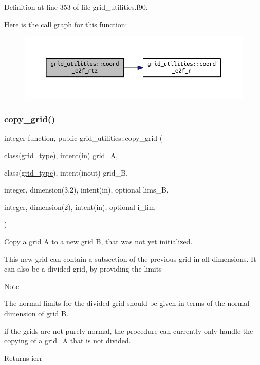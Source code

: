 Definition at line 353 of file grid\+\_\+utilities.\+f90.

Here is the call graph for this function\+:
\nopagebreak
\begin{figure}[H]
\begin{center}
\leavevmode
\includegraphics[width=350pt]{namespacegrid__utilities_a2a3c0509679b438d9d5aa5bedfb7a7b8_cgraph}
\end{center}
\end{figure}
\mbox{\label{namespacegrid__utilities_a04f971c38083f873a04eb6568bed466b}} 
\subsubsection{\texorpdfstring{copy\+\_\+grid()}{copy\_grid()}}
{\footnotesize\ttfamily integer function, public grid\+\_\+utilities\+::copy\+\_\+grid (\begin{DoxyParamCaption}\item[{class(\hyperlink{structgrid__vars_1_1grid__type}{grid\+\_\+type}), intent(in)}]{grid\+\_\+A,  }\item[{class(\hyperlink{structgrid__vars_1_1grid__type}{grid\+\_\+type}), intent(inout)}]{grid\+\_\+B,  }\item[{integer, dimension(3,2), intent(in), optional}]{lims\+\_\+B,  }\item[{integer, dimension(2), intent(in), optional}]{i\+\_\+lim }\end{DoxyParamCaption})}



Copy a grid A to a new grid B, that was not yet initialized. 

This new grid can contain a subsection of the previous grid in all dimensions. It can also be a divided grid, by providing the limits

\begin{DoxyNote}{Note}

\begin{DoxyEnumerate}
\item The normal limits for the divided grid should be given in terms of the normal dimension of {\ttfamily grid} B.
\item if the grids are not purely normal, the procedure can currently only handle the copying of a {\ttfamily grid\+\_\+A} that is not divided.
\end{DoxyEnumerate}
\end{DoxyNote}
\begin{DoxyReturn}{Returns}
ierr
\end{DoxyReturn}

